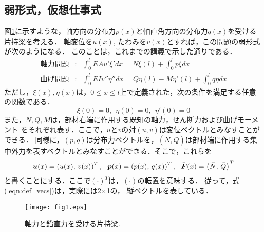 ﻿\documentclass[10pt,a4j]{jarticle}
\begin{document}
\subsection{弱形式，仮想仕事式}
図\ref{fig:fig1}に示すような，軸方向の分布力$p(x)$と軸直角方向の分布力$q(x)$を受ける片持梁を考える．
軸変位を$u(x)$, たわみを$v(x)$とすれば，この問題の弱形式が次のようになる．
このことは，これまでの講義で示した通りである．
\begin{eqnarray}
	軸力問題 &:&
	\int_0^l EAu'\xi'dx =  
	\bar N \xi(l)+\int_0^l p\xi dx 
	\label{eqn:WF_N}
	\\
	曲げ問題 &:&
	\int_0^l EIv''\eta''dx =
	\bar Q \eta(l)-\bar M\eta'(l) +\int_0^l q\eta dx 
	\label{eqn:WF_M}
\end{eqnarray}
ただし，$\xi(x),\eta(x)$は，$0\leq x \leq l$上で定義された，次の条件を満足する任意の関数である．
\begin{equation}
	\xi(0)=0, \ \ \eta(0)=0, \ \ \eta'(0)=0
	\label{eqn:}
\end{equation}
また，$\bar{N},\bar{Q},\bar{M}$は，部材右端に作用する既知の軸力，せん断力および曲げモーメント
をそれぞれ表す．ここで，$u$と$v$の対$(u,v)$は変位ベクトルとみなすことができる．
同様に，$(p,q)$は分布力ベクトルを，$(\bar{N},\bar{Q})$は部材端に作用する集中外力を表すベクトルとみなすことができる．そこで，これらを
\begin{equation}
	\fat{u}(x)=\left(u(x),\, v(x) \right)^T
	, \ \ 
	\fat{p}(x)=\left(p(x),\, q(x) \right)^T
	, \ \ 
	\bar{\fat{F}}(x)=\left(\bar{N},\, \bar{Q} \right)^T
	\label{eqn:def_vecs}
\end{equation}
と書くことにする．ここで$(\cdot)^T$は，$(\cdot)$の転置を意味する．
従って，式(\ref{eqn:def_vecs})は，実際には2$\times$1の，
縦ベクトルを表している．
\begin{figure}[h]
	\begin{center}
	\texttt{[image: fig1.eps]} 
	\end{center}
	\caption{軸力と鉛直力を受ける片持梁.} 
	\label{fig:fig1}
\end{figure}
\end{document}
